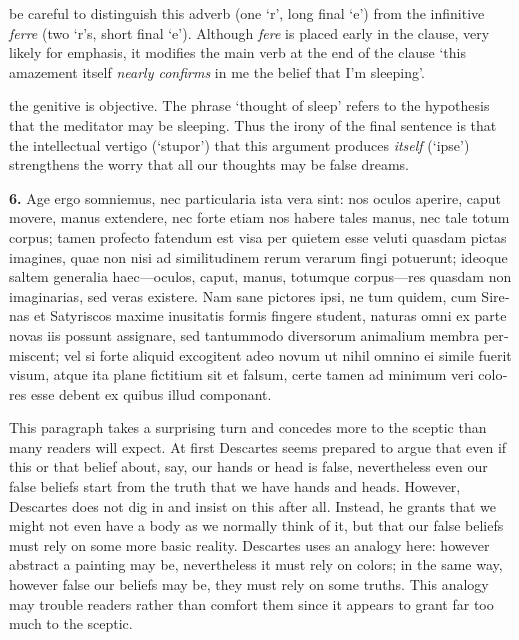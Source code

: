  be careful to distinguish this adverb (one `r', long final `e') from the infinitive \textit{ferre} (two `r's, short final `e'). Although \textit{fere} is placed early in the clause, very likely for emphasis, it modifies the main verb at the end of the clause `this amazement itself \textit{nearly confirms} in me the belief that I'm sleeping'.

 the genitive is objective. The phrase `thought of sleep' refers to the hypothesis that the meditator may be sleeping. Thus the irony of the final sentence is that the intellectual vertigo (`stupor') that this argument produces \textit{itself} (`ipse') strengthens the worry that all our thoughts may be false dreams.

\clearpage

\beginnumbering
\pstart
\begin{latin}
\textenglish{\textbf{6.}} Age ergo somniemus, nec particularia ista vera sint: nos oculos aperire, caput movere, manus extendere, nec forte etiam nos habere tales manus, nec tale totum corpus; tamen profecto fatendum est visa per quietem esse veluti quasdam pictas imagines, quae non nisi ad similitudinem rerum verarum fingi potuerunt; ideoque saltem generalia haec---oculos, caput, manus, totumque corpus---res quasdam non imaginarias, sed veras existere. Nam sane pictores ipsi, ne tum quidem, cum Sirenas et Satyriscos maxime inusitatis formis fingere student, naturas omni ex parte novas iis possunt assignare, sed tantummodo diversorum animalium membra permiscent; vel si forte aliquid excogitent adeo novum ut nihil omnino ei simile fuerit visum, atque ita plane fictitium sit et falsum, certe tamen ad minimum veri colores esse debent ex quibus illud componant.
\end{latin}
\pend
\endnumbering

\prenotes

This paragraph takes a surprising turn and concedes more to the sceptic than many readers will expect. At first Descartes seems prepared to argue that even if this or that belief about, say, our hands or head is false, nevertheless even our false beliefs start from the truth that we have hands and heads. However, Descartes does not dig in and insist on this after all. Instead, he grants that we might not even have a body as we normally think of it, but that our false beliefs must rely on some more basic reality. Descartes uses an analogy here: however abstract a painting may be, nevertheless it must rely on colors; in the same way, however false our beliefs may be, they must rely on some truths. This analogy may trouble readers rather than comfort them since it appears to grant far too much to the sceptic.

